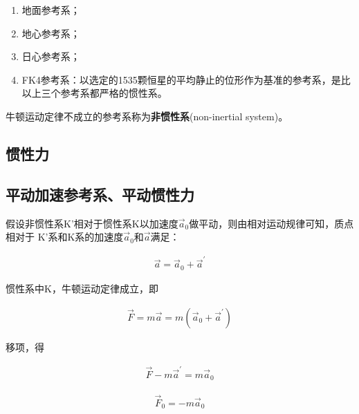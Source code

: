 \documentclass[
	12pt, %
	a4paper, %
]{myLegrandOrangeBook}
\begin{document}
    \begin{enumerate}
        \item 地面参考系；
        \item 地心参考系；
        \item 日心参考系；
        \item FK4参考系：以选定的1535颗恒星的平均静止的位形作为基准的参考系，是比以上三个参考系都严格的惯性系。
    \end{enumerate}

    \vspace{1em}
    \begin{definition}[非惯性系]

        牛顿运动定律不成立的参考系称为\textbf{非惯性系}(non-inertial system)。
        
    \end{definition}

\subsection{惯性力}

\subsection{平动加速参考系、平动惯性力}

    假设非惯性系K'相对于惯性系K以加速度\(\overrightarrow{a}_{0}\)做平动，则由相对运动规律可知，质点相对于
    K'系和K系的加速度\(\overrightarrow{a}_{0}\)和\(\overrightarrow{a}\)满足：

    \begin{align}
        \overrightarrow{a} = \overrightarrow{a}_{0} + \overrightarrow{a}^{'}
    \end{align}

    惯性系中K，牛顿运动定律成立，即

    \begin{align}
        \overrightarrow{F} = m \overrightarrow{a} = m \left(\overrightarrow{a}_{0} + \overrightarrow{a}^{'}\right)
    \end{align}

    移项，得

    \begin{align}
        \overrightarrow{F} - m\overrightarrow{a}^{'} =  m \overrightarrow{a}_{0}
    \end{align}

    \vspace{1em}
    \begin{definition}[平动惯性力]

        \begin{align}
            \overrightarrow{F}_{0} = - m\overrightarrow{a}_{0}
        \end{align}
    \end{definition}
\end{document}
